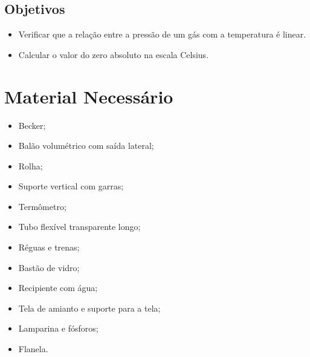 \subsection{Objetivos}
\label{Sec:ObjetivosZeroAbsoluto}

\begin{itemize}
	\item Verificar que a relação entre a pressão de um gás com a temperatura é linear.
	\item Calcular o valor do zero absoluto na escala Celsius.
\end{itemize}

\section{Material Necessário}

\begin{multicols}{2}
\begin{itemize}
	\item Becker;
	\item Balão volumétrico com saída lateral;
	\item Rolha;
	\item Suporte vertical com garras;
	\item Termômetro;
	\item Tubo flexível transparente longo;
	\item Réguas e trenas;
	\item Bastão de vidro;
	\item Recipiente com água;
	\item Tela de amianto e suporte para a tela;
	\item Lamparina e fósforos;
	\item Flanela.
\end{itemize}
\end{multicols}

